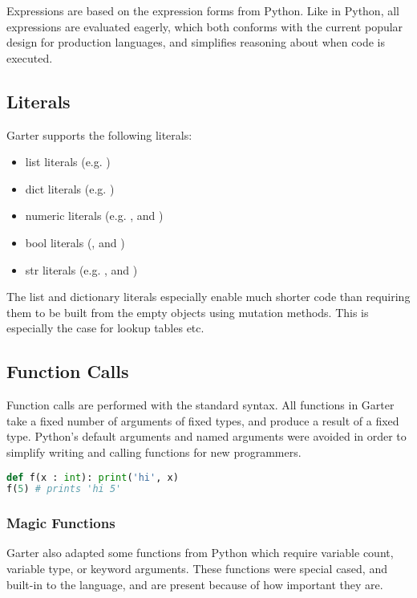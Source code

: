 Expressions are based on the expression forms from Python. Like in Python, all
expressions are evaluated eagerly, which both conforms with the current popular
design for production languages, and simplifies reasoning about when code is
executed. 

\subsection{Literals}

Garter supports the following literals:
\begin{itemize}
\item list literals (e.g. \code{[1, 2, 3]})
\item dict literals (e.g. )
\item numeric literals (e.g. , and )
\item bool literals (, and )
\item str literals (e.g. , and )
\end{itemize}

The list and dictionary literals especially enable much shorter code than
requiring them to be built from the empty objects using mutation methods. This
is especially the case for lookup tables etc.

\subsection{Function Calls}

Function calls are performed with the standard  syntax. All functions in
Garter take a fixed number of arguments of fixed types, and produce a result of
a fixed type. Python's default arguments and named arguments were avoided in order to
simplify writing and calling functions for new programmers.

\begin{lstlisting}[language=Python]
def f(x : int): print('hi', x)
f(5) # prints 'hi 5'
\end{lstlisting}

\subsubsection{Magic Functions}

Garter also adapted some functions from Python which require variable count,
variable type, or keyword arguments. These functions were special cased, and
built-in to the language, and are present because of how important they are.

